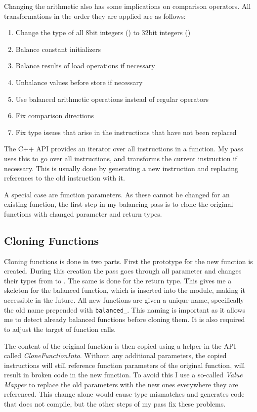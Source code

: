 Changing the arithmetic also has some implications on comparison operators.
All transformations in the order they are applied are as follows:
\begin{enumerate}
\item Change the type of all 8bit integers () to 32bit integers ()
\item Balance constant initializers
\item Balance results of load operations if necessary
\item Unbalance values before store if necessary
\item Use balanced arithmetic operations instead of regular operators
\item Fix comparison directions
\item Fix type issues that arise in the instructions that have not been replaced
\end{enumerate}

The \llvm{} C++ API provides an iterator over all instructions in a function.
My pass uses this to go over all instructions, and transforms the current instruction if necessary.
This is usually done by generating a new \ir{} instruction and replacing references to the old instruction with it.

A special case are function parameters.
As these cannot be changed for an existing function, the first step in my balancing pass is to clone the original functions with changed parameter and return types.

\subsection{Cloning Functions}
Cloning functions is done in two parts.
First the prototype for the new function is created.
During this creation the pass goes through all parameter and changes their types from  to .
The same is done for the return type.
This gives me a skeleton for the balanced function, which is inserted into the module, making it accessible in the future.
All new functions are given a unique name, specifically the old name prepended with \texttt{balanced\_}.
This naming is important as it allows me to detect already balanced functions before cloning them.
It is also required to adjust the target of function calls.

The content of the original function is then copied using a helper in the \llvm{} API called \emph{CloneFunctionInto}.
Without any additional parameters, the copied instructions will still reference function parameters of the original function, will result in broken code in the new function.
To avoid this I use a so-called \emph{Value Mapper} to replace the old parameters with the new ones everywhere they are referenced.
This change alone would cause type mismatches and generates code that does not compile, but the other steps of my pass fix these problems.

